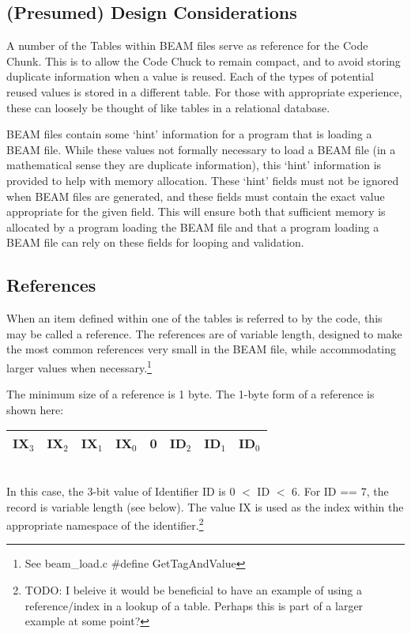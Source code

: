 \documentclass{article}
\begin{document}
\subsection{(Presumed) Design Considerations}

A number of the Tables within BEAM files serve as reference for the Code Chunk. 
This is to allow the Code Chuck to remain compact, and to avoid storing duplicate
information when a value is reused.  Each of the types of potential
reused values is stored in a different table.  For those with appropriate 
experience, these can loosely be thought of like tables in a relational database.

BEAM files contain some `hint' information for a program that is loading a BEAM file.
While these values not formally necessary to load a BEAM file (in a mathematical sense
they are duplicate information), this `hint' information is provided to help with memory
allocation.  These `hint' fields must not be ignored when BEAM files are generated, and
these fields must contain the exact value appropriate for the given field.  This will
ensure both that sufficient memory is allocated by a program loading the BEAM file and
that a program loading a BEAM file can rely on these fields for looping and validation. 

\subsection{References}

When an item defined within one of the tables is referred to by the code, this may be
called a reference.  The references are of variable length, designed to make the most
common references very small in the BEAM file, while accommodating larger values when
necessary.\footnote{See beam\_load.c \#define GetTagAndValue}

The minimum size of a reference is 1 byte.  
The 1-byte form of a reference is shown here:\\
\begin{tabular}{ |l|l|l|l|l|l|l|l| } \hline
IX$_3$ & IX$_2$ & IX$_1$ & IX$_0$ &   0   & ID$_2$ & ID$_1$ & ID$_0$  \\ \hline
\end{tabular}\\

In this case, the 3-bit value of Identifier ID is 0 $<$ ID $<$ 6. 
For ID == 7, the record is variable length (see below).  
The value IX is used as the index within the appropriate 
namespace of the identifier.\footnote{TODO:
I beleive it would be beneficial to have an example of using a reference/index in a
lookup of a table.  Perhaps this is part of a larger example at some point?}
\end{document}
